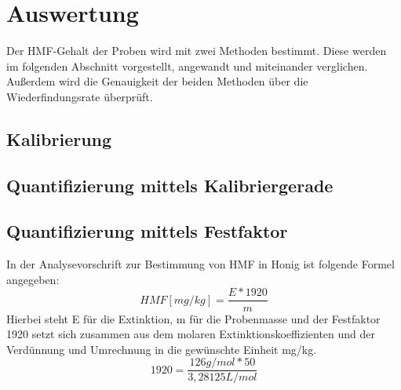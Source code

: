 \chapter{Auswertung}
Der HMF-Gehalt der Proben wird mit zwei Methoden bestimmt. Diese werden im folgenden Abschnitt vorgestellt, angewandt und miteinander verglichen. Außerdem wird die Genauigkeit der beiden Methoden über die Wiederfindungsrate überprüft.
\section{Kalibrierung}

\section{Quantifizierung mittels Kalibriergerade}

\section{Quantifizierung mittels Festfaktor}
In der Analysevorschrift zur Bestimmung von HMF in Honig ist folgende Formel angegeben:
	\[HMF[mg/kg]=\frac{ E * 1920 }{ m }\]
Hierbei steht E für die Extinktion, m für die Probenmasse und der Festfaktor 1920 setzt sich zusammen aus dem molaren Extinktionskoeffizienten und der Verdünnung und Umrechnung in die gewünschte Einheit mg/kg.
	\[1920=\frac{ 126g/mol * 50 }{ 3,28125L/mol }\]

